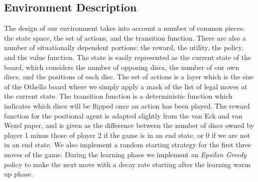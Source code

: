 \documentclass{article}
\begin{document}
\subsection{\label{doc:env_desc}Environment Description}

The design of our environment takes into account a number of common pieces: the state space, the set of actions, and the transition function. There are also a number of situationally dependent portions: the reward, the utility, the policy, and the value function. The state is easily represented as the current state of the board, which considers the number of opposing discs, the number of our own discs, and the positions of each disc. The set of actions is a layer which is the size of the Othello board where we simply apply a mask of the list of legal moves at the current state. The transition function is a deterministic function which indicates which discs will be flipped once an action has been played. The reward function for the positional agent is adapted slightly from the van Eck and van Wezel paper, and is given as the difference between the number of discs owned by player 1 minus those of player 2 if the game is in an end state, or 0 if we are not in an end state. We also implement a random starting strategy for the first three moves of the game. During the learning phase we implement an \textit{Epsilon Greedy} policy to make the next move with a decay rate starting after the learning warm up phase. 
\end{document}
